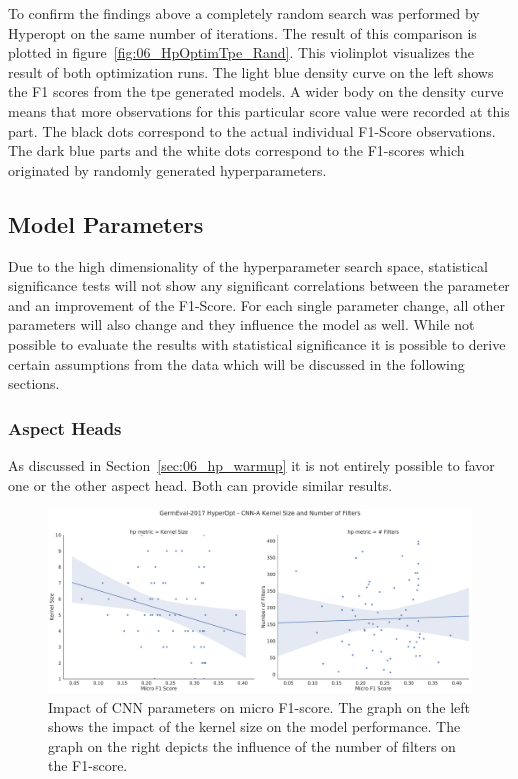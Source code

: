 To confirm the findings above a completely random search was performed by Hyperopt on the same number of iterations. The result of this comparison is plotted in figure~\ref{fig:06_HpOptimTpe_Rand}. This violinplot visualizes the result of both optimization runs. The light blue density curve on the left shows the F1 scores from the \gls{tpe} generated models. A wider body on the density curve means that more observations for this particular score value were recorded at this part. The black dots correspond to the actual individual F1-Score observations. The dark blue parts and the white dots correspond to the F1-scores which originated by randomly generated hyperparameters.

\subsection{Model Parameters}

Due to the high dimensionality of the hyperparameter search space, statistical significance tests will not show any significant correlations between the parameter and an improvement of the F1-Score. For each single parameter change, all other parameters will also change and they influence the model as well. While not possible to evaluate the results with statistical significance it is possible to derive certain assumptions from the data which will be discussed in the following sections.

\subsubsection{Aspect Heads}

As discussed in Section~\ref{sec:06_hp_warmup} it is not entirely possible to favor one or the other aspect head. Both can provide similar results. 

\begin{figure}[ht]
	\centering
	\includegraphics[width=\textwidth]{figures/06_results/06_hp_ge_lm_cnnParams_test}
	\caption{Impact of CNN parameters on micro F1-score. The graph on the left shows the impact of the kernel size on the model performance. The graph on the right depicts the influence of the number of filters on the F1-score.}
	\label{fig:06_HpOptim_CnnParams}
\end{figure}

